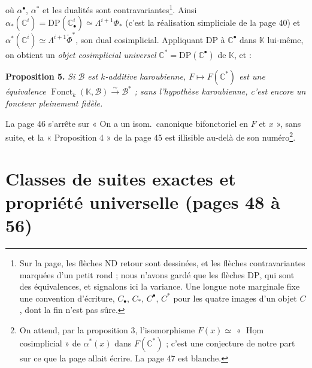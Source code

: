 \documentclass[11pt,a4paper]{article}
\begin{document}

où $\alpha^{\bullet}$, $\alpha^{*}$ et les dualités sont
contravariantes\footnote{Sur la page, les flèches $\mathrm{ND}$ retour sont
dessinées, et les flèches contravariantes marquées d'un petit rond ; nous
n'avons gardé que les flèches $\mathrm{DP}$, qui sont des équivalences, et
signalons ici la variance. Une longue note marginale fixe une convention
d'écriture, $C_{\bullet}$, $C_{*}$, $C^{\bullet}$, $C^{*}$ pour les quatre
images d'un objet $C$, dont la fin n'est pas sûre.}. Ainsi
$\alpha_{*}(\mathbb{C}^{i}) = \mathrm{DP}(\mathbb{C}^{i}_{\bullet}) \simeq
\Lambda^{i+1}\Phi_{*}$ (c'est la réalisation simpliciale de la page 40) et
$\alpha^{*}(\mathbb{C}^{i}) \simeq \Lambda^{i+1}\check{\Phi}^{*}$, son dual
cosimplicial. Appliquant $\mathrm{DP}$ à $\mathbb{C}^{\bullet}$ dans
$\mathbb{K}$ lui-même, on obtient un \emph{objet cosimplicial universel}
$\mathbb{C}^{*} = \mathrm{DP}(\mathbb{C}^{\bullet})$ de $\mathbb{K}$, et :

\textbf{Proposition 5.} \emph{Si $\mathcal{B}$ est $k$-additive karoubienne,
$F \mapsto F(\mathbb{C}^{*})$ est une équivalence
$\operatorname{Fonct}_{k}(\mathbb{K}, \mathcal{B}) \xrightarrow{\sim}
\mathcal{B}^{*}$ ; sans l'hypothèse karoubienne, c'est encore un foncteur
pleinement fidèle.}

La page 46 s'arrête sur « On a un isom.\ canonique bifonctoriel en $F$ et
$x$ », sans suite, et la « Proposition 4 » de la page 45 est illisible au-delà
de son numéro\footnote{On attend, par la proposition 3, l'isomorphisme
$F(x) \simeq$ « $\underline{\operatorname{Hom}}$ cosimplicial » de
$\alpha^{*}(x)$ dans $F(\mathbb{C}^{*})$ ; c'est une conjecture de notre part
sur ce que la page allait écrire. La page 47 est blanche.}.

\section*{Classes de suites exactes et propriété universelle (pages 48 à 56)}
\end{document}

